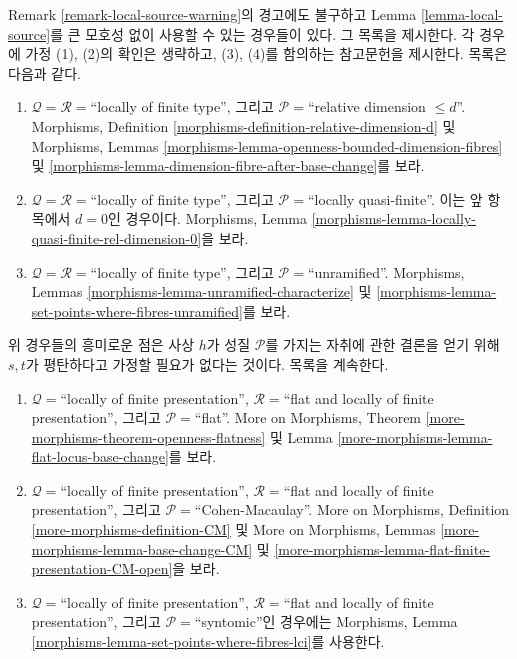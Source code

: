 \begin{remark}
\label{remark-local-source-apply}
Remark \ref{remark-local-source-warning}의 경고에도 불구하고
Lemma \ref{lemma-local-source}를 큰 모호성 없이 사용할 수 있는 경우들이 있다.
그 목록을 제시한다. 각 경우에 가정 (1), (2)의 확인은 생략하고,
(3), (4)를 함의하는 참고문헌을 제시한다. 목록은 다음과 같다.
\begin{enumerate}
\item $\mathcal{Q} = \mathcal{R} =$``locally of finite type'', 그리고
$\mathcal{P} =$``relative dimension $\leq d$''.
Morphisms, Definition \ref{morphisms-definition-relative-dimension-d} 및
Morphisms, Lemmas \ref{morphisms-lemma-openness-bounded-dimension-fibres} 및
\ref{morphisms-lemma-dimension-fibre-after-base-change}를 보라.
\item $\mathcal{Q} = \mathcal{R} =$``locally of finite type'', 그리고
$\mathcal{P} =$``locally quasi-finite''.
이는 앞 항목에서 $d = 0$인 경우이다. Morphisms, Lemma
\ref{morphisms-lemma-locally-quasi-finite-rel-dimension-0}을 보라.
\item $\mathcal{Q} = \mathcal{R} =$``locally of finite type'', 그리고
$\mathcal{P} =$``unramified''.
Morphisms, Lemmas \ref{morphisms-lemma-unramified-characterize} 및
\ref{morphisms-lemma-set-points-where-fibres-unramified}를 보라.
\end{enumerate}
위 경우들의 흥미로운 점은 사상 $h$가 성질 $\mathcal{P}$를 가지는 자취에
관한 결론을 얻기 위해 $s, t$가 평탄하다고 가정할 필요가 없다는 것이다.
목록을 계속한다.
\begin{enumerate}
\item[(4)] $\mathcal{Q} =$``locally of finite presentation'',
$\mathcal{R} =$``flat and locally of finite presentation'', 그리고
$\mathcal{P} =$``flat''. More on Morphisms, Theorem
\ref{more-morphisms-theorem-openness-flatness} 및 Lemma
\ref{more-morphisms-lemma-flat-locus-base-change}를 보라.
\item[(5)] $\mathcal{Q} =$``locally of finite presentation'',
$\mathcal{R} =$``flat and locally of finite presentation'', 그리고
$\mathcal{P}=$``Cohen-Macaulay''. More on Morphisms, Definition
\ref{more-morphisms-definition-CM} 및 More on Morphisms, Lemmas
\ref{more-morphisms-lemma-base-change-CM} 및
\ref{more-morphisms-lemma-flat-finite-presentation-CM-open}을 보라.
\item[(6)] $\mathcal{Q} =$``locally of finite presentation'',
$\mathcal{R} =$``flat and locally of finite presentation'', 그리고
$\mathcal{P}=$``syntomic''인 경우에는 Morphisms, Lemma
\ref{morphisms-lemma-set-points-where-fibres-lci}를 사용한다.

\end{enumerate}
\end{remark}
